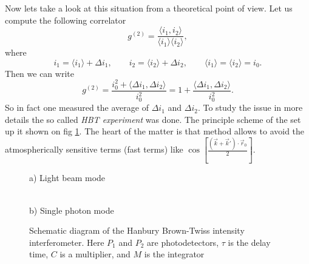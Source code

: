 Now lets take a look at this situation from a theoretical point of view. Let us compute the following correlator
\begin{equation}
	g^{(2)} = \frac{\langle i_1, i_2 \rangle }{\langle i_1 \rangle \langle i_2 \rangle},
\end{equation}
where
\begin{equation}
	i_1 = \langle i_1 \rangle + \Delta i_1, \qquad i_2 = \langle i_2 \rangle + \Delta i_2, \qquad \langle i_1 \rangle = \langle i_2 \rangle = i_0.
\end{equation}
Then we can write
\begin{equation}
	g^{(2)} = \frac{i_0^2 + \langle \Delta i_1, \Delta i_2 \rangle}{i_0^2} = 1 + \frac{\langle \Delta i_1, \Delta i_2 \rangle}{i_0^2}.
\end{equation}
So in fact one measured the average of $\Delta i_1$ and $\Delta i_2$. To study the issue in more details the so called \textit{HBT experiment} was done. The principle scheme of the set up it shown on fig \ref{fig:HBT_exp}. The heart of the matter is that method allows to avoid the atmospherically sensitive terms (fast terms) like $\cos \left[ \frac{(\vec{k} + \vec{k}') \cdot \vec{r}_0}{2} \right]$.

\begin{figure}
	\centering
	\begin{minipage}[h]{0.70\linewidth}
		 a) Light beam mode\\
	\end{minipage}
	\vfill
	\begin{minipage}[h]{0.7\linewidth}
		 \\b) Single photon mode
	\end{minipage}
	\caption{Schematic diagram of the Hanbury Brown-Twiss intensity interferometer. Here $P_1$ and $P_2$ are photodetectors, $\tau$ is the delay time, $C$ is a multiplier, and $M$ is the integrator}
	\label{fig:HBT_exp}
\end{figure}

